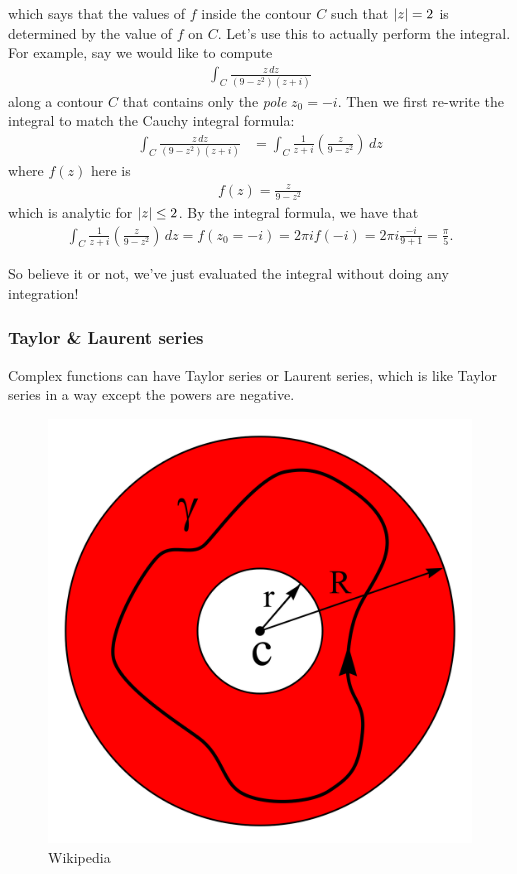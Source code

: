 \documentclass{book}
\theoremstyle{definition}
\newcommand{\f}[2]{\frac{#1}{#2}}
\newcommand{\lp}{\left(}
\newcommand{\rp}{\right)}
\begin{document}
which says that the values of $f$ inside the contour $C$ such that $\abs{z} = 2$ is determined by the value of $f$ on $C$. Let's use this to actually perform the integral. For example, say we would like to compute 
\begin{align}
\int_C \f{z\,dz}{(9-z^2)(z+i)} 
\end{align}
along a contour $C$ that contains only the \textit{pole} $z_0 = -i$. Then we first re-write the integral to match the Cauchy integral formula:
\begin{align}
\int_C \f{z\,dz}{(9-z^2)(z+i)} &= \int_C \f{1}{z+i}\lp \f{z}{9 - z^2} \rp\,dz
\end{align}
where $f(z)$ here is
\begin{align}
f(z) = \f{z}{9 - z^2}
\end{align}
which is analytic for $\abs{z} \leq 2$. By the integral formula, we have that
\begin{align}
\int_C \f{1}{z+i}\lp \f{z}{9 - z^2} \rp\,dz = f(z_0 = -i) = 2\pi i f(-i) = 2\pi i \f{-i}{9 + 1} = \f{\pi}{5}.
\end{align}

So believe it or not, we've just evaluated the integral without doing any integration!












\subsubsection{Taylor \& Laurent series}

Complex functions can have Taylor series or Laurent series, which is like Taylor series in a way except the powers are negative. 

\begin{figure}[!htb]
	\centering
	\includegraphics[scale=0.15]{laurent}
	\caption{Wikipedia}
\end{figure}
\end{document}
